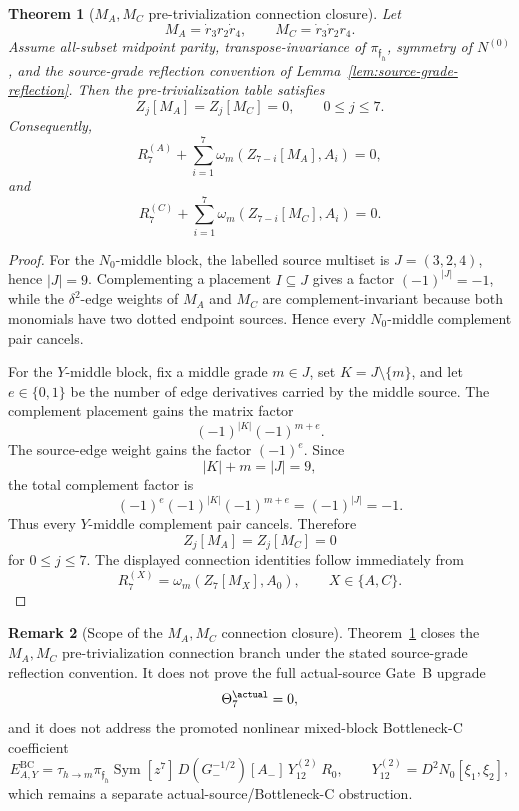 \documentclass[11pt,a4paper]{amsart}
\theoremstyle{plain}
\newtheorem{theorem}{Theorem}[section]
\theoremstyle{definition}
\newtheorem{remark}[theorem]{Remark}
\begin{document}
\begin{theorem}[\(M_A,M_C\) pre-trivialization connection closure]
\label{thm:ma-mc-pretriv-connection-closure-final}
Let
\[
M_A=\dot r_3r_2\dot r_4,
\qquad
M_C=\dot r_3\dot r_2r_4.
\]
Assume all-subset midpoint parity, transpose-invariance of
\(\pi_{\mathfrak f_h}\), symmetry of \(N^{(0)}\), and the source-grade
reflection convention of Lemma~\ref{lem:source-grade-reflection}.  Then the
pre-trivialization table satisfies
\[
Z_j[M_A]=Z_j[M_C]=0,
\qquad 0\le j\le7.
\]
Consequently,
\[
R_7^{(A)}
+
\sum_{i=1}^{7}\omega_m(Z_{7-i}[M_A],A_i)=0,
\]
and
\[
R_7^{(C)}
+
\sum_{i=1}^{7}\omega_m(Z_{7-i}[M_C],A_i)=0.
\]
\end{theorem}

\begin{proof}
For the \(N_0\)-middle block, the labelled source multiset is
\(J=(3,2,4)\), hence \(|J|=9\).  Complementing a placement
\(I\subseteq J\) gives a factor \((-1)^{|J|}=-1\), while the
\(\delta^2\)-edge weights of \(M_A\) and \(M_C\) are complement-invariant
because both monomials have two dotted endpoint sources.  Hence every
\(N_0\)-middle complement pair cancels.

For the \(Y\)-middle block, fix a middle grade \(m\in J\), set
\(K=J\setminus\{m\}\), and let \(e\in\{0,1\}\) be the number of edge
derivatives carried by the middle source.  The complement placement gains
the matrix factor
\[
(-1)^{|K|}(-1)^{m+e}.
\]
The source-edge weight gains the factor \((-1)^e\).  Since
\[
|K|+m=|J|=9,
\]
the total complement factor is
\[
(-1)^e(-1)^{|K|}(-1)^{m+e}
=
(-1)^{|J|}
=
-1.
\]
Thus every \(Y\)-middle complement pair cancels.  Therefore
\[
Z_j[M_A]=Z_j[M_C]=0
\]
for \(0\le j\le7\).  The displayed connection identities follow immediately
from
\[
R_7^{(X)}=\omega_m(Z_7[M_X],A_0),
\qquad X\in\{A,C\}.
\]
\end{proof}

\begin{remark}[Scope of the \(M_A,M_C\) connection closure]
\label{rem:scope-ma-mc-connection-closure-final}
Theorem~\ref{thm:ma-mc-pretriv-connection-closure-final} closes the
\(M_A,M_C\) pre-trivialization connection branch under the stated
source-grade reflection convention.  It does not prove the full
actual-source Gate~B upgrade
\[
\Theta_7^{\actual}=0,
\]
and it does not address the promoted nonlinear mixed-block Bottleneck-C
coefficient
\[
E_{A,Y}^{\mathrm{BC}}
=
\tau_{h\to m}\pi_{\mathfrak f_h}
\operatorname{Sym}
[z^7]\,
D(G_-^{-1/2})[A_-]\,
Y_{12}^{(2)}\,
R_0,
\qquad
Y_{12}^{(2)}=D^2N_0[\xi_1,\xi_2],
\]
which remains a separate actual-source/Bottleneck-C obstruction.
\end{remark}
\end{document}
